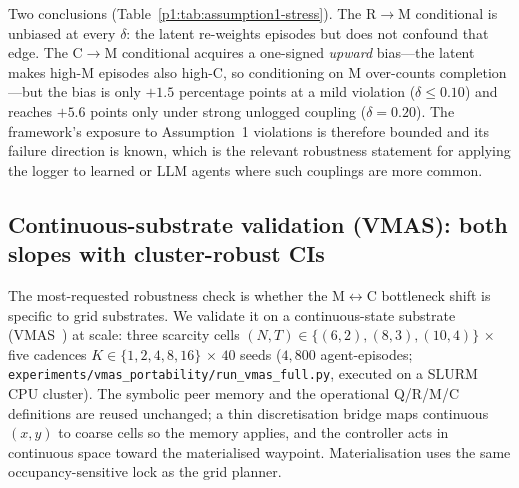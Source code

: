 \documentclass{article}
\newcommand{\method}[1]{\texttt{#1}}
\begin{document}
Two conclusions (Table~\ref{p1:tab:assumption1-stress}). The R$\to$M conditional is unbiased at every $\delta$: the latent re-weights episodes but does not confound that edge. The C$\to$M conditional acquires a one-signed \emph{upward} bias---the latent makes high-M episodes also high-C, so conditioning on M over-counts completion---but the bias is only $+1.5$ percentage points at a mild violation ($\delta\!\le\!0.10$) and reaches $+5.6$ points only under strong unlogged coupling ($\delta{=}0.20$). The framework's exposure to Assumption~1 violations is therefore bounded and its failure direction is known, which is the relevant robustness statement for applying the logger to learned or LLM agents where such couplings are more common.

\subsection{Continuous-substrate validation (VMAS): both slopes with cluster-robust CIs}
\label{p1:app:vmas}

The most-requested robustness check is whether the M$\leftrightarrow$C
bottleneck shift is specific to grid substrates. We validate it on a
continuous-state substrate (VMAS~\citep{bettini2022vmas}) at scale: three
scarcity cells $(N,T)\in\{(6,2),(8,3),(10,4)\}$ $\times$ five cadences
$K\in\{1,2,4,8,16\}$ $\times$ $40$ seeds ($4{,}800$ agent-episodes;
\method{experiments/vmas\_portability/run\_vmas\_full.py}, executed on a SLURM
CPU cluster). The symbolic peer memory and the operational Q/R/M/C definitions
are reused unchanged; a thin discretisation bridge maps continuous $(x,y)$ to
coarse cells so the memory applies, and the controller acts in continuous space
toward the materialised waypoint. Materialisation uses the same
occupancy-sensitive lock as the grid planner.
\end{document}
